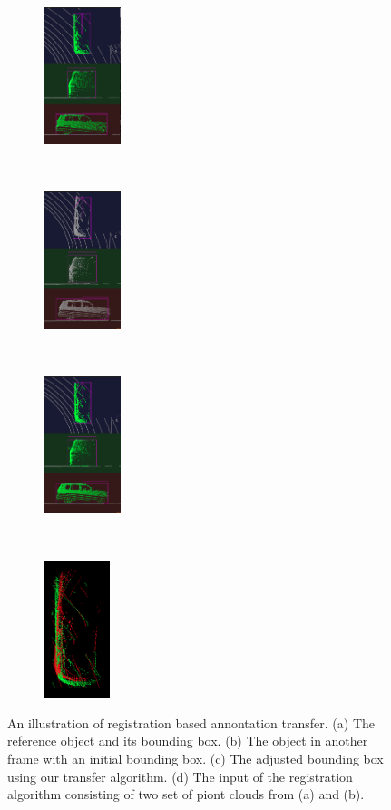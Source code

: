 \documentclass[letterpaper, 10 pt, conference]{ieeeconf}  %
\begin{document}
\begin{figure}[t]
	\centering
	\begin{subfigure}[t]{0.18\linewidth}
		\includegraphics[height=4cm]{./figures/reg-ref-3d}
		\caption{}\label{fig:box-ref}
	\end{subfigure}\hfill
	~
	\begin{subfigure}[t]{0.18\linewidth}
		\includegraphics[height=4cm]{./figures/reg-input-3d}
		\caption{}\label{fig:box-source}
	\end{subfigure}\hfill
	~
	\begin{subfigure}[t]{0.18\linewidth}
		\includegraphics[height=4cm]{./figures/reg-result-3d}
		\caption{}\label{fig:box-output}
	\end{subfigure}\hfill
	~
	\begin{subfigure}[t]{0.18\linewidth}
		\includegraphics[height=4cm]{./figures/reg-input}
		\caption{}\label{fig:reg-input}
	\end{subfigure}\hfill
	\caption{
		An illustration of registration based annontation transfer. (a) The reference object and its bounding box. (b) The object in another frame with an initial bounding box. (c) The adjusted bounding box using our transfer algorithm. (d) The input of the registration algorithm consisting of two set of piont clouds from (a) and (b).}		
	\label {fig:annotation-transfer}
\end{figure}
\end{document}
